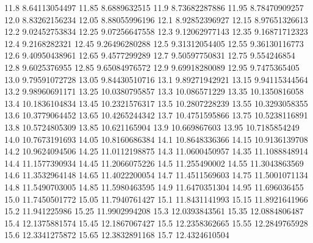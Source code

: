           11.8    8.64113054497
          11.85     8.6889632515
           11.9    8.73682287886
          11.95    8.78470909257
           12.0    8.83262156234
          12.05    8.88055996196
           12.1    8.92852396927
          12.15    8.97651326613
           12.2    9.02452753834
          12.25    9.07256647558
           12.3    9.12062977143
          12.35    9.16871712323
           12.4     9.2168282321
          12.45    9.26496280288
           12.5    9.31312054405
          12.55    9.36130116773
           12.6    9.40950438961
          12.65     9.4577299289
           12.7    9.50597750831
          12.75      9.554246854
           12.8     9.6025376955
          12.85    9.65084976572
           12.9    9.69918280089
          12.95     9.7475365405
           13.0    9.79591072728
          13.05    9.84430510716
           13.1    9.89271942921
          13.15    9.94115344564
           13.2    9.98960691171
          13.25    10.0380795857
           13.3     10.086571229
          13.35    10.1350816058
           13.4    10.1836104834
          13.45    10.2321576317
           13.5    10.2807228239
          13.55    10.3293058355
           13.6    10.3779064452
          13.65    10.4265244342
           13.7    10.4751595866
          13.75    10.5238116891
           13.8    10.5724805309
          13.85     10.621165904
           13.9     10.669867603
          13.95    10.7185854249
           14.0    10.7673191693
          14.05    10.8160686384
           14.1    10.8648336366
          14.15    10.9136139708
           14.2    10.9624094506
          14.25    11.0112198875
           14.3    11.0600450957
          14.35    11.1088848914
           14.4    11.1577390934
          14.45    11.2066075226
           14.5     11.255490002
          14.55    11.3043863569
           14.6    11.3532964148
          14.65    11.4022200054
           14.7    11.4511569603
          14.75    11.5001071134
           14.8    11.5490703005
          14.85    11.5980463595
           14.9    11.6470351304
          14.95     11.696036455
           15.0    11.7450501772
          15.05    11.7940761427
           15.1    11.8431141993
          15.15    11.8921641966
           15.2     11.941225986
          15.25    11.9902994208
           15.3    12.0393843561
          15.35    12.0884806487
           15.4    12.1375881574
          15.45    12.1867067427
           15.5    12.2358362665
          15.55    12.2849765928
           15.6    12.3341275872
          15.65    12.3832891168
           15.7    12.4324610504
